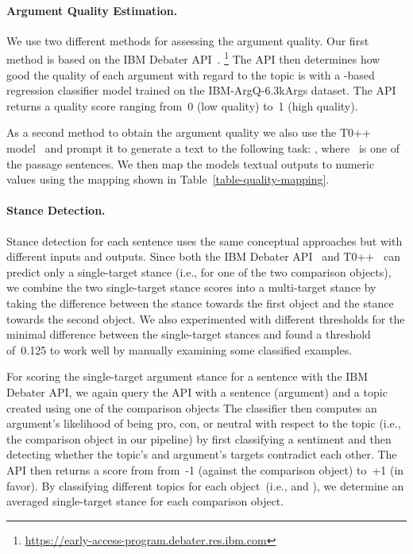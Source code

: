 \paragraph{Argument Quality Estimation.}


We use two different methods for assessing the argument quality.
Our first method is based on the IBM Debater API~\cite{ToledoGCFVLJAS2019}.%
\footnote{\url{https://early-access-program.debater.res.ibm.com}}
The API then determines how good the quality of each argument with regard to the topic is with a \Bert-based~\cite{DevlinCLT2019} regression classifier model trained on the IBM-ArgQ-6.3kArgs dataset. The API returns a quality score ranging from~0 (low quality) to~1 (high quality).

As a second method to obtain the argument quality we also use the T0++ model~\cite{SanhWRBSACSLRDBXTSSKCNDCJWMSYPBWNRSSFFTBGBWR2021} and prompt it to generate a text to the following task: \hspace{.5em} , where ~is one of the passage sentences.
We then map the models textual outputs to numeric values using the mapping shown in Table~\ref{table-quality-mapping}.

\paragraph{Stance Detection.}

Stance detection for each sentence uses the same conceptual approaches but with different inputs and outputs.
Since both the IBM Debater API~\cite{BarHaimBDSS2017} and  T0++~\cite{SanhWRBSACSLRDBXTSSKCNDCJWMSYPBWNRSSFFTBGBWR2021} can predict only a single-target stance (i.e., for one of the two comparison objects), we combine the two single-target stance scores into a multi-target stance by taking the difference between the stance towards the first object and the stance towards the second object.
We also experimented with different thresholds for the minimal difference between the single-target stances and found a threshold of~0.125 to work well by manually examining some classified examples.

For scoring the single-target argument stance for a sentence with the IBM Debater API, we again query the API with a sentence (argument) and a topic created using one of the comparison objects
The classifier \cite{BarHaimBDSS2017} then computes an argument's likelihood of being pro, con, or neutral with respect to the topic (i.e., the comparison object in our pipeline) by first classifying a sentiment and then detecting whether the topic's and argument's targets contradict each other.
The API then returns a score from from~-1 (against the comparison object) to~+1 (in favor).
By classifying different topics for each object~(i.e.,  and ), we determine an averaged single-target stance for each comparison object.

